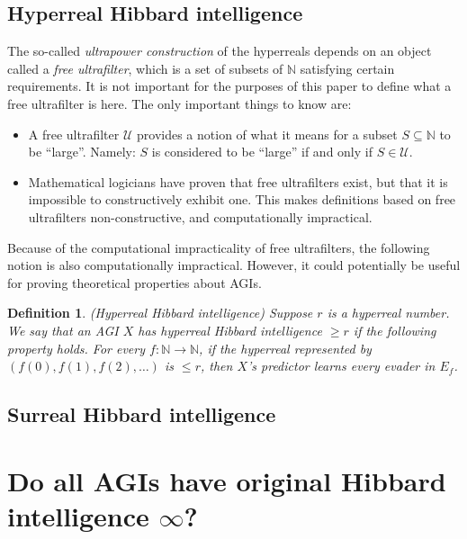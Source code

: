 \documentclass{article}
\newtheorem{definition}[theorem]{Definition}
\begin{document}
\subsection{Hyperreal Hibbard intelligence}

The so-called \emph{ultrapower construction} of the hyperreals depends on an object
called a \emph{free ultrafilter}, which is a set of subsets of $\mathbb N$ satisfying
certain requirements. It is not important for the purposes of this paper to define what
a free ultrafilter is here. The only important things to know are:
\begin{itemize}
    \item
    A free ultrafilter $\mathscr U$ provides a notion of what it means for a subset
    $S\subseteq\mathbb N$ to be ``large''. Namely: $S$ is considered to be ``large''
    if and only if $S\in \mathscr U$.
    \item
    Mathematical logicians have proven that free ultrafilters exist, but that it is
    impossible to constructively exhibit one. This makes definitions based on free
    ultrafilters non-constructive, and computationally impractical.
\end{itemize}

Because of the computational impracticality of free ultrafilters, the following notion
is also computationally impractical. However, it could potentially be useful for
proving theoretical properties about AGIs.

\begin{definition}
    (Hyperreal Hibbard intelligence)
    Suppose $r$ is a hyperreal number. We say that an AGI $X$ has \emph{hyperreal
    Hibbard intelligence $\geq r$} if the following property holds.
    For every $f:\mathbb N\to\mathbb N$, if the hyperreal represented by
    $(f(0),f(1),f(2),\ldots)$ is $\leq r$, then $X$'s predictor learns every
    evader in $E_f$.
\end{definition}

\subsection{Surreal Hibbard intelligence}



\section{Do all AGIs have original Hibbard intelligence $\infty$?}
\label{trivialitysection}
\end{document}
